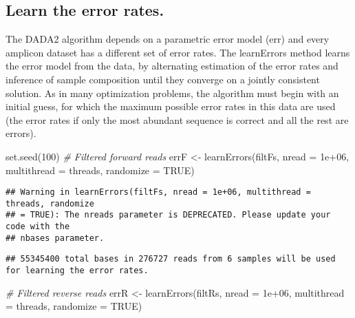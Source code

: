 \documentclass[
]{article}
\newenvironment{Shaded}{\begin{snugshade}}{\end{snugshade}}
\newcommand{\AttributeTok}[1]{\textcolor[rgb]{0.77,0.63,0.00}{#1}}
\newcommand{\CommentTok}[1]{\textcolor[rgb]{0.56,0.35,0.01}{\textit{#1}}}
\newcommand{\ConstantTok}[1]{\textcolor[rgb]{0.00,0.00,0.00}{#1}}
\newcommand{\DecValTok}[1]{\textcolor[rgb]{0.00,0.00,0.81}{#1}}
\newcommand{\FloatTok}[1]{\textcolor[rgb]{0.00,0.00,0.81}{#1}}
\newcommand{\FunctionTok}[1]{\textcolor[rgb]{0.00,0.00,0.00}{#1}}
\newcommand{\NormalTok}[1]{#1}
\newcommand{\OtherTok}[1]{\textcolor[rgb]{0.56,0.35,0.01}{#1}}
\begin{document}
\hypertarget{learn-the-error-rates.}{%
\subsection{Learn the error rates.}\label{learn-the-error-rates.}}

The DADA2 algorithm depends on a parametric error model (err) and every
amplicon dataset has a different set of error rates. The learnErrors
method learns the error model from the data, by alternating estimation
of the error rates and inference of sample composition until they
converge on a jointly consistent solution. As in many optimization
problems, the algorithm must begin with an initial guess, for which the
maximum possible error rates in this data are used (the error rates if
only the most abundant sequence is correct and all the rest are errors).

\begin{Shaded}
\begin{Highlighting}[]
\FunctionTok{set.seed}\NormalTok{(}\DecValTok{100}\NormalTok{)}
\CommentTok{\# Filtered forward reads}
\NormalTok{errF }\OtherTok{\textless{}{-}} \FunctionTok{learnErrors}\NormalTok{(filtFs, }\AttributeTok{nread =} \FloatTok{1e+06}\NormalTok{, }\AttributeTok{multithread =}\NormalTok{ threads, }
    \AttributeTok{randomize =} \ConstantTok{TRUE}\NormalTok{)}
\end{Highlighting}
\end{Shaded}

\begin{verbatim}
## Warning in learnErrors(filtFs, nread = 1e+06, multithread = threads, randomize
## = TRUE): The nreads parameter is DEPRECATED. Please update your code with the
## nbases parameter.
\end{verbatim}

\begin{verbatim}
## 55345400 total bases in 276727 reads from 6 samples will be used for learning the error rates.
\end{verbatim}

\begin{Shaded}
\begin{Highlighting}[]
\CommentTok{\# Filtered reverse reads}
\NormalTok{errR }\OtherTok{\textless{}{-}} \FunctionTok{learnErrors}\NormalTok{(filtRs, }\AttributeTok{nread =} \FloatTok{1e+06}\NormalTok{, }\AttributeTok{multithread =}\NormalTok{ threads, }
    \AttributeTok{randomize =} \ConstantTok{TRUE}\NormalTok{)}
\end{Highlighting}
\end{Shaded}
\end{document}

